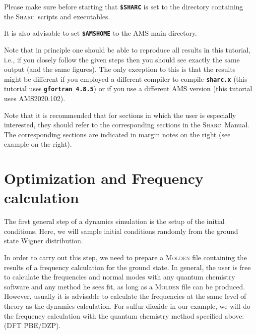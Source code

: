 \documentclass[a4paper,11pt,DIV=15,openany]{scrbook}
\makeatletter
\newcommand{\refermanual}[2][rectangle,draw=B,thick,fill=black!5,inner sep=1pt,outer sep=0pt,rounded corners]{\marginpar{\tikz[baseline=(current bounding box.north)]\node at (0,0) [#1]{\begin{tabular}{@{}l@{}}See\\ section\\ \ref*{#2}\\ (p. \pageref*{#2})\\ in the\\ manual.\end{tabular}};}}
\newcommand{\sharc}{\textsc{Sharc}}
\newcommand{\ttt}[1]{\textbf{\texttt{#1}}}
\makeatother
\begin{document}
\begin{shaded}
  Please make sure before starting that \ttt{\$SHARC} is set to the directory containing the \sharc\ scripts and executables.

  It is also advisable to set \ttt{\$AMSHOME} to the \textsc{AMS} main directory.
\end{shaded}

Note that in principle one should be able to reproduce all results in this tutorial, i.e., if you closely follow the given steps then you should see exactly the same output (and the same figures).
The only exception to this is that the results might be different if you employed a different compiler to compile \ttt{sharc.x} (this tutorial uses \ttt{gfortran 4.8.5}) or if you use a different \textsc{AMS} version (this tutorial uses \textsc{AMS2020.102}).

\refermanual{m-chap:aux}
Note that it is recommended that for sections in which the user is especially interested, they should refer to the corresponding sections in the \sharc\ Manual.
The corresponding sections are indicated in margin notes on the right (see example on the right).



\clearpage
\section{Optimization and Frequency calculation}\label{tut:optfreq}

The first general step of a dynamics simulation is the setup of the initial conditions.
Here, we will sample initial conditions randomly from the ground state Wigner distribution.

In order to carry out this step, we need to prepare a \textsc{Molden} file containing the results of a frequency calculation for the ground state.
In general, the user is free to calculate the frequencies and normal modes with any quantum chemistry software and any method he sees fit, as long as a \textsc{Molden} file can be produced. 
However, usually it is advisable to calculate the frequencies at the same level of theory as the dynamics calculation. 
For sulfur dioxide in our example, we will do the frequency calculation with the quantum chemistry method specified above: (DFT PBE/DZP). 
\end{document}
